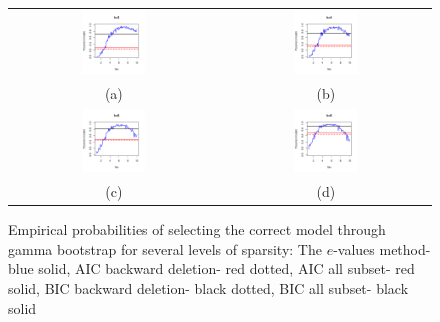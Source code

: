 \begin{figure}
\begin{center}

\begin{tabular}{cc}
		\includegraphics[width=0.32\textwidth]{Chapter-evalue/simplot_gamma2}
	& 
		\includegraphics[width=0.32\textwidth]{Chapter-evalue/simplot_gamma4} \\
	(a) & (b) \\	
		\includegraphics[width=0.32\textwidth]{Chapter-evalue/simplot_gamma6}
	& 
		\includegraphics[width=0.32\textwidth]{Chapter-evalue/simplot_gamma8} \\
	(c) & (d) \\	
\end{tabular}

\caption{Empirical probabilities of selecting the correct model through gamma bootstrap for several levels of sparsity:  The $e$-values method- blue solid, AIC backward deletion- red dotted, AIC all subset- red solid, BIC backward deletion- black dotted, BIC all subset- black solid}
\label{fig:simplotsgamma}

\end{center}
\end{figure}

